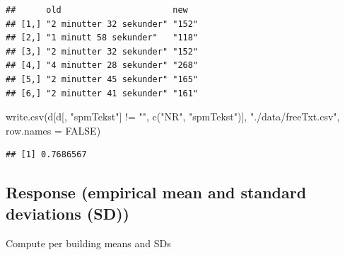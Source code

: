 \documentclass[
]{article}
\newenvironment{Shaded}{\begin{snugshade}}{\end{snugshade}}
\newcommand{\AttributeTok}[1]{\textcolor[rgb]{0.77,0.63,0.00}{#1}}
\newcommand{\ConstantTok}[1]{\textcolor[rgb]{0.00,0.00,0.00}{#1}}
\newcommand{\DecValTok}[1]{\textcolor[rgb]{0.00,0.00,0.81}{#1}}
\newcommand{\FunctionTok}[1]{\textcolor[rgb]{0.00,0.00,0.00}{#1}}
\newcommand{\NormalTok}[1]{#1}
\newcommand{\OtherTok}[1]{\textcolor[rgb]{0.56,0.35,0.01}{#1}}
\newcommand{\SpecialCharTok}[1]{\textcolor[rgb]{0.00,0.00,0.00}{#1}}
\newcommand{\StringTok}[1]{\textcolor[rgb]{0.31,0.60,0.02}{#1}}
\begin{document}
\begin{verbatim}
##      old                      new  
## [1,] "2 minutter 32 sekunder" "152"
## [2,] "1 minutt 58 sekunder"   "118"
## [3,] "2 minutter 32 sekunder" "152"
## [4,] "4 minutter 28 sekunder" "268"
## [5,] "2 minutter 45 sekunder" "165"
## [6,] "2 minutter 41 sekunder" "161"
\end{verbatim}

\begin{Shaded}
\end{Shaded}

\begin{Shaded}
\begin{Highlighting}[]
\FunctionTok{write.csv}\NormalTok{(d[d[, }\StringTok{"spmTekst"}\NormalTok{] }\SpecialCharTok{!=} \StringTok{""}\NormalTok{, }\FunctionTok{c}\NormalTok{(}\StringTok{"NR"}\NormalTok{, }\StringTok{"spmTekst"}\NormalTok{)], }\StringTok{"./data/freeTxt.csv"}\NormalTok{, }\AttributeTok{row.names =} \ConstantTok{FALSE}\NormalTok{)}
\end{Highlighting}
\end{Shaded}

\begin{Shaded}
\end{Shaded}

\begin{verbatim}
## [1] 0.7686567
\end{verbatim}

\hypertarget{response-empirical-mean-and-standard-deviations-sd}{%
\subsection{Response (empirical mean and standard deviations (SD))}\label{response-empirical-mean-and-standard-deviations-sd}}

Compute per building means and SDs
\end{document}
